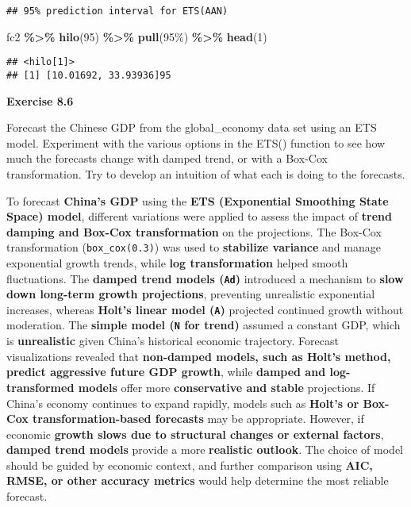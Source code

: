 \documentclass[
]{article}
\newenvironment{Shaded}{\begin{snugshade}}{\end{snugshade}}
\newcommand{\DecValTok}[1]{\textcolor[rgb]{0.00,0.00,0.81}{#1}}
\newcommand{\FunctionTok}[1]{\textcolor[rgb]{0.13,0.29,0.53}{\textbf{#1}}}
\newcommand{\NormalTok}[1]{#1}
\newcommand{\SpecialCharTok}[1]{\textcolor[rgb]{0.81,0.36,0.00}{\textbf{#1}}}
\newcommand{\StringTok}[1]{\textcolor[rgb]{0.31,0.60,0.02}{#1}}
\begin{document}
\begin{verbatim}
## 95% prediction interval for ETS(AAN)
\end{verbatim}

\begin{Shaded}
\begin{Highlighting}[]
\NormalTok{fc2 }\SpecialCharTok{\%\textgreater{}\%} \FunctionTok{hilo}\NormalTok{(}\DecValTok{95}\NormalTok{) }\SpecialCharTok{\%\textgreater{}\%} \FunctionTok{pull}\NormalTok{(}\StringTok{\textquotesingle{}95\%\textquotesingle{}}\NormalTok{) }\SpecialCharTok{\%\textgreater{}\%} \FunctionTok{head}\NormalTok{(}\DecValTok{1}\NormalTok{)}
\end{Highlighting}
\end{Shaded}

\begin{verbatim}
## <hilo[1]>
## [1] [10.01692, 33.93936]95
\end{verbatim}

\textbf{Exercise 8.6}

Forecast the Chinese GDP from the global\_economy data set using an ETS
model. Experiment with the various options in the ETS() function to see
how much the forecasts change with damped trend, or with a Box-Cox
transformation. Try to develop an intuition of what each is doing to the
forecasts.

To forecast \textbf{China's GDP} using the \textbf{ETS (Exponential
Smoothing State Space) model}, different variations were applied to
assess the impact of \textbf{trend damping and Box-Cox transformation}
on the projections. The Box-Cox transformation (\texttt{box\_cox(0.3)})
was used to \textbf{stabilize variance} and manage exponential growth
trends, while \textbf{log transformation} helped smooth fluctuations.
The \textbf{damped trend models (\texttt{Ad})} introduced a mechanism to
\textbf{slow down long-term growth projections}, preventing unrealistic
exponential increases, whereas \textbf{Holt's linear model (\texttt{A})}
projected continued growth without moderation. The \textbf{simple model
(\texttt{N} for trend)} assumed a constant GDP, which is
\textbf{unrealistic} given China's historical economic trajectory.
Forecast visualizations revealed that \textbf{non-damped models, such as
Holt's method, predict aggressive future GDP growth}, while
\textbf{damped and log-transformed models} offer more
\textbf{conservative and stable} projections. If China's economy
continues to expand rapidly, models such as \textbf{Holt's or Box-Cox
transformation-based forecasts} may be appropriate. However, if economic
\textbf{growth slows due to structural changes or external factors},
\textbf{damped trend models} provide a more \textbf{realistic outlook}.
The choice of model should be guided by economic context, and further
comparison using \textbf{AIC, RMSE, or other accuracy metrics} would
help determine the most reliable forecast.
\end{document}
